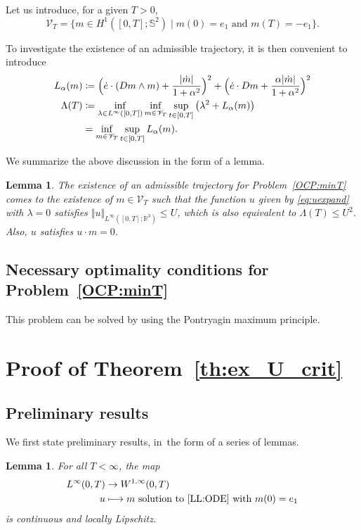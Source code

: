 \documentclass[10pt]{amsart}
\newcommand\mto{\mathchoice{\longmapsto}{\mapsto}{\mapsto}{\mapsto}}
\newtheorem{lemma}[theorem]{Lemma}
\theoremstyle{definition}
\begin{document}
Let us introduce, for a given $T>0$,
\[
\mathscr{V}_T=\{m\in H^1([0,T];\mathbb{S}^2)\mid m(0)=e_1\text{ and }m(T)=-e_1\}.
\]

To investigate the existence of an admissible trajectory, it is then convenient to introduce
\begin{align}\label{ob:aux}
L_\alpha(m) &\coloneqq \Bigl(\dot e\cdot (Dm\wedge m)+\frac{|\dot m|}{1+\alpha^2}\Bigr)^2+\Bigl(\dot e\cdot Dm+\frac{\alpha|\dot m|}{1+\alpha^2}\Bigr)^2\\
\Lambda(T)&\coloneqq \inf_{\lambda\in L^\infty([0,T])}\inf_{m\in \mathscr{V}_T}\sup_{t\in [0,T]}\left(\lambda^2+L_\alpha(m) \right)\nonumber \\
&= \inf_{m\in \mathscr{V}_T}\sup_{t\in [0,T]}L_\alpha(m).
\end{align}

We summarize the above discussion in the form of a lemma.

\begin{lemma}\label{lem:2057}
The existence of an admissible trajectory for Problem~\eqref{OCP:minT} comes to the existence of $m\in \mathscr{V}_T$ such that the function $u$ given by \eqref{eq:uexpand} with $\lambda =0$ satisfies $\Vert u\Vert_{L^\infty([0,T];\mathbb{R}^3)}\leq U $, which is also equivalent to $\Lambda(T)\leq U ^2$. Also, $u$ satisfies $u \cdot m=0$.
\end{lemma}

\subsection{Necessary optimality conditions for Problem~\texorpdfstring{\eqref{OCP:minT}}{P0}}\label{optCond:PMP}
This problem can be solved by using the Pontryagin maximum principle.
\setcounter{theorem}{12}
\section{Proof of Theorem~\ref{th:ex_U_crit}}\label{proof:theo2}
\subsection{Preliminary results}
We first state preliminary results, in~the form of a series of lemmas.

\begin{lemma} \label{lem:cont_flow}
For all $T < \infty$, the map
\begin{align*}
L^\infty (0, T) &\to W^{1, \infty} (0, T) \\
u &\mto m \text{ solution to \eqref{LL:ODE} with } m(0) = e_1
\end{align*}
is continuous and locally Lipschitz.
\end{lemma}
\end{document}
